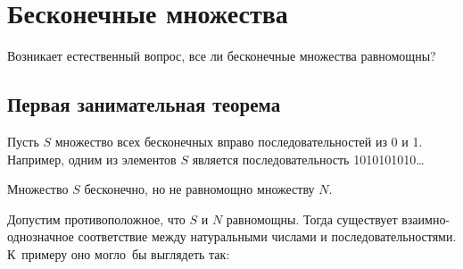 \documentclass[10pt,a4paper]{article}
\begin{document}
  \newpage
  \begin{center}
 \Large{}
 \end{center}
  \newpage
\section{Бесконечные множества} 

Возникает естественный вопрос, все ли бесконечные множества равномощны?

\subsection{Первая занимательная теорема}

Пусть $S$ множество всех бесконечных вправо последовательностей из 0 и 1. Например, одним из элементов $S$ является последовательность 1010101010\ldots

Множество $S$ бесконечно, но не равномощно множеству $N$.

Допустим противоположное, что $S$ и $N$ равномощны. Тогда существует взаимно-однозначное соответствие между натуральными числами и последовательностями. К~примеру оно могло~бы выглядеть так:
\end{document}
